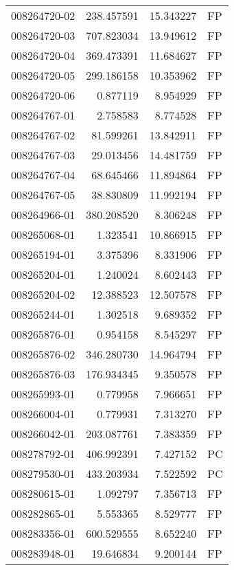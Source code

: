 \begin{tabular}{lrrl}
008264720-02 &  238.457591 &      15.343227 &   FP \\
008264720-03 &  707.823034 &      13.949612 &   FP \\
008264720-04 &  369.473391 &      11.684627 &   FP \\
008264720-05 &  299.186158 &      10.353962 &   FP \\
008264720-06 &    0.877119 &       8.954929 &   FP \\
008264767-01 &    2.758583 &       8.774528 &   FP \\
008264767-02 &   81.599261 &      13.842911 &   FP \\
008264767-03 &   29.013456 &      14.481759 &   FP \\
008264767-04 &   68.645466 &      11.894864 &   FP \\
008264767-05 &   38.830809 &      11.992194 &   FP \\
008264966-01 &  380.208520 &       8.306248 &   FP \\
008265068-01 &    1.323541 &      10.866915 &   FP \\
008265194-01 &    3.375396 &       8.331906 &   FP \\
008265204-01 &    1.240024 &       8.602443 &   FP \\
008265204-02 &   12.388523 &      12.507578 &   FP \\
008265244-01 &    1.302518 &       9.689352 &   FP \\
008265876-01 &    0.954158 &       8.545297 &   FP \\
008265876-02 &  346.280730 &      14.964794 &   FP \\
008265876-03 &  176.934345 &       9.350578 &   FP \\
008265993-01 &    0.779958 &       7.966651 &   FP \\
008266004-01 &    0.779931 &       7.313270 &   FP \\
008266042-01 &  203.087761 &       7.383359 &   FP \\
008278792-01 &  406.992391 &       7.427152 &   PC \\
008279530-01 &  433.203934 &       7.522592 &   PC \\
008280615-01 &    1.092797 &       7.356713 &   FP \\
008282865-01 &    5.553365 &       8.529777 &   FP \\
008283356-01 &  600.529555 &       8.652240 &   FP \\
008283948-01 &   19.646834 &       9.200144 &   FP \\

\end{tabular}

